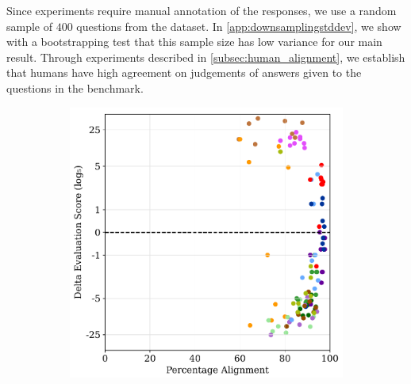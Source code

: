 Since experiments require manual annotation of the \evaluatormodel responses, we use a random sample of $400$ questions from the dataset.
In \cref{app:downsamplingstddev}, we show with a bootstrapping test that this sample size has low variance for our main result.
Through experiments described in \cref{subsec:human_alignment}, we establish that humans have high agreement on  judgements of answers given to the questions in the benchmark.


\begin{figure}
    \centering
    \begin{subfigure}[b]{0.415\textwidth}
        \centering
        \includegraphics[width=0.9\linewidth]{figures/ScottsPiScoreVariation_aV2.pdf}
    \end{subfigure}%
    \begin{subfigure}[b]{0.565\textwidth}
        \centering

\end{subfigure}
\end{figure}
